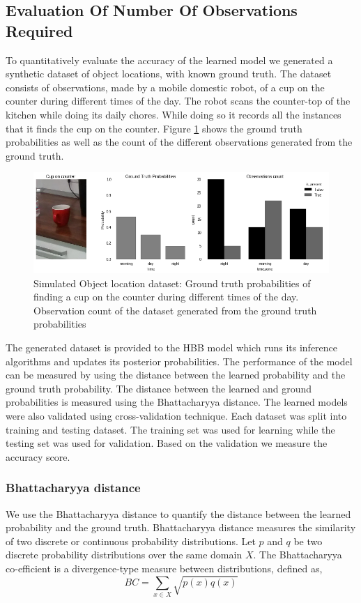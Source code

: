 \subsection{Evaluation Of Number Of Observations Required}

To quantitatively evaluate the accuracy of the learned model we generated a synthetic dataset of object locations, with known ground truth. The dataset consists of observations, made by a mobile domestic robot, of a cup on the counter during different times of the day. The robot scans the counter-top of the kitchen while doing its daily chores. While doing so it records all the instances that it finds the cup on the counter. Figure \ref{simulation} shows the ground truth probabilities as well as the count of the different observations generated from the ground truth.

\begin{figure}[htp]
\centering
\includegraphics[width=\textwidth]{images/object_simulation.png}
\caption[Simulated object location dataset]{Simulated Object location dataset: Ground truth probabilities of finding a cup on the counter during different times of the day. Observation count of the dataset generated from the ground truth probabilities}
\label{simulation}
\end{figure}

The generated dataset is provided to the HBB model which runs its inference algorithms and updates its posterior probabilities. The performance of the model can be measured by using the distance between the learned probability and the ground truth probability.  The distance between the learned and ground probabilities is measured using the Bhattacharyya distance. The learned models were also validated using cross-validation technique. Each dataset was split into training and testing dataset. The training set was used for learning while the testing set was used for validation. Based on the validation we measure the accuracy score. 


\subsubsection*{Bhattacharyya distance}
We use the Bhattacharyya distance \cite{bhattacharyya1946measure} to quantify the distance between the learned probability and the ground truth. Bhattacharyya distance measures the similarity of two discrete or continuous probability distributions. 
Let  $p$ and $q$ be two discrete probability distributions over the same domain $X$. The Bhattacharyya co-efficient \cite{bhattacharyya1946measure} is a divergence-type measure between distributions, defined as,
\begin{equation}
	BC = \sum_{x\in X}\sqrt{p (x)  q (x)} 
\end{equation}

